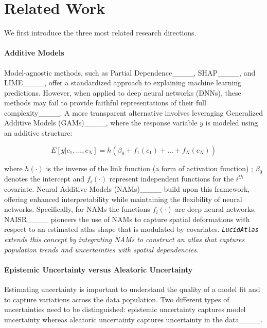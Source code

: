 \section{Related Work}
We first introduce the three most related research directions. 

\paragraph{Additive Models}
Model-agnostic methods, such as Partial Dependence____, SHAP____, and LIME____, offer a standardized approach to explaining machine learning predictions. However, when applied to deep neural networks (DNNs), these methods may fail to provide faithful representations of their full complexity____. A more transparent alternative involves leveraging Generalized Additive Models (GAMs)____, where the response variable \( y \) is modeled using an additive structure:  
\begin{small}
\begin{equation}
E[y | c_1, . . . , c_N] = h(\beta_0 + f_1(c_1) + \dots + f_N(c_N))
\label{eq.nam}
\end{equation}
\end{small}
where \( h(\cdot) \) is the inverse of the link function (a form of activation function) ; $\beta_0$ denotes the intercept and $f_{i}(\cdot)$ represent independent functions for the $i^{th}$ covariate. Neural Additive Models (NAMs)____ build upon this framework, offering enhanced interpretability while maintaining the flexibility of neural networks. Specifically, for NAMs the functions $f_i(\cdot)$ are deep neural networks. NAISR____ pioneers the use of NAMs to capture spatial deformations with respect to an estimated atlas shape that is modulated by covariates. \emph{\texttt{LucidAtlas} extends this concept by integrating NAMs to construct an atlas that captures population trends and uncertainties with spatial dependencies}.

\paragraph{Epistemic Uncertainty versus Aleatoric Uncertainty}

Estimating uncertainty is important to understand the quality of a model fit and to capture variations across the data population. Two different types of uncertainties need to be distinguished: epistemic uncertainty captures model uncertainty whereas aleatoric uncertainty captures uncertainty in the data____. 

